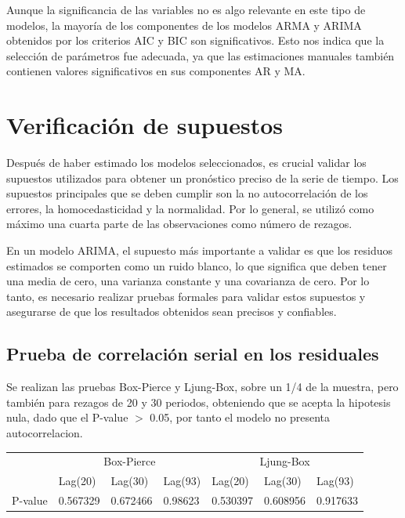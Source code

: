 \documentclass[11pt]{article}
\begin{document}
Aunque la significancia de las variables no es algo relevante en este tipo de modelos, la mayoría de los componentes de los modelos ARMA y ARIMA obtenidos por los criterios AIC y BIC son significativos. Esto nos indica que la selección de parámetros fue adecuada, ya que las estimaciones manuales también contienen valores significativos en sus componentes AR y MA.

\section{Verificación de supuestos\protect\footnotemark}
  
Después de haber estimado los modelos seleccionados, es crucial validar los supuestos utilizados para obtener un pronóstico preciso de la serie de tiempo. Los supuestos principales que se deben cumplir son la no autocorrelación de los errores, la homocedasticidad y la normalidad. Por lo general, se utilizó como máximo una cuarta parte de las observaciones como número de rezagos.

En un modelo ARIMA, el supuesto más importante a validar es que los residuos estimados se comporten como un ruido blanco, lo que significa que deben tener una media de cero, una varianza constante y una covarianza de cero. Por lo tanto, es necesario realizar pruebas formales para validar estos supuestos y asegurarse de que los resultados obtenidos sean precisos y confiables.


    
\subsection{Prueba de correlación serial en los residuales}
    Se realizan las pruebas Box-Pierce y Ljung-Box, sobre un 1/4 de la muestra, pero también para rezagos de 20 y 30 periodos, obteniendo que se acepta la hipotesis nula, dado que el P-value $>$ 0.05, por tanto el modelo no presenta autocorrelacion.

\begin{table}[!ht]
    \begin{center}
        \begin{tabular}{l|lll|lll|}
            \cline{2-7}
                & \multicolumn{3}{c|}{Box-Pierce} & \multicolumn{3}{c|}{Ljung-Box} \\ 
            \cline{2-7} 
                & \multicolumn{1}{l|}{Lag(20)} & \multicolumn{1}{l|}{Lag(30)} & Lag(93) & \multicolumn{1}{l|}{Lag(20)} & \multicolumn{1}{l|}{Lag(30)} & Lag(93) \\ 
            \cline{2-7} 
            P-value & \multicolumn{1}{l|}{0.567329} & \multicolumn{1}{l|}{0.672466} & 0.98623 & \multicolumn{1}{l|}{0.530397} & \multicolumn{1}{l|}{0.608956} & 0.917633 \\ 
            \cline{2-7} 
        \end{tabular}
    \end{center}
\end{table}
    
\end{document}
